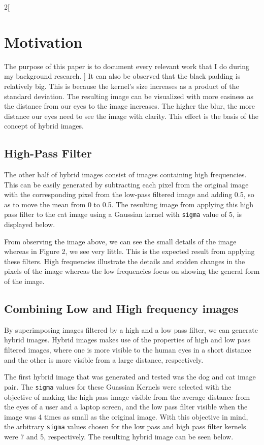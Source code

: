 \documentclass[a4paper]{article}
\begin{document}
\begin{multicols}{2}[
		\section*{Motivation}
		The purpose of this paper is to document every relevant work that I do during my background research.
		]
		It can also be observed that the black padding is relatively big. This is because the kernel's size increases as a product of the standard deviation. The resulting image can be visualized with more easiness as the distance from our eyes to the image increases. The higher the blur, the more distance our eyes need to see the image with clarity. This effect is the basis of the concept of hybrid images.
		
		\subsection{High-Pass Filter}
		The other half of hybrid images consist of images containing high frequencies. This can be easily generated by subtracting each pixel from the original image with the corresponding pixel from the low-pass filtered image and adding 0.5, so as to move the mean from 0 to 0.5. The resulting image from applying this high pass filter to the cat image using a Gaussian kernel with \texttt{sigma} value of 5, is displayed below.

		
		From observing the image above, we can see the small details of the image whereas in Figure 2, we see very little. This is the expected result from applying these filters. High frequencies illustrate the details and sudden changes in the pixels of the image whereas the low frequencies focus on showing the general form of the image.
		
		\subsection{Combining Low and High frequency images}
		By superimposing images filtered by a high and a low pass filter, we can generate hybrid images. Hybrid images makes use of the properties of high and low pass filtered images, where one is more visible to the human eyes in a short distance and the other is more visible from a large distance, respectively.
		
		The first hybrid image that was generated and tested was the dog and cat image pair. The \texttt{sigma} values for these Guassian Kernels were selected with the objective of making the high pass image visible from the average distance from the eyes of a user and a laptop screen, and the low pass filter visible when the image was 4 times as small as the original image. With this objective in mind, the arbitrary \texttt{sigma} values chosen for the low pass and high pass filter kernels were 7 and 5, respectively. The resulting hybrid image can be seen below.


\end{multicols}
\end{document}
